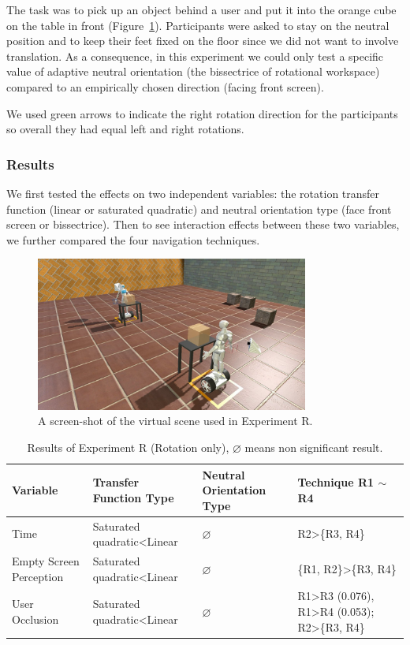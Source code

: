 The task was to pick up an object behind a user and put it into the orange cube on the table in front (Figure~\ref{fig:4_task2}). Participants were asked to stay on the neutral position and to keep their feet fixed on the floor since we did not want to involve translation. As a consequence, in this experiment we could only test a specific value of adaptive neutral orientation (the bissectrice of rotational workspace) compared to an empirically chosen direction (facing front screen).

We used green arrows to indicate the right rotation direction for the participants so overall they had equal left and right rotations.

\subsubsection{Results}
We first tested the effects on two independent variables: the rotation transfer function (linear or saturated quadratic) and neutral orientation type (face front screen or bissectrice). Then to see interaction effects between these two variables, we further compared the four navigation techniques.

\begin{figure}[htb]
  \centering
  \includegraphics[width=0.8\textwidth]{figures/ch4/t2}
  \caption{\label{fig:4_task2}A screen-shot of the virtual scene used in Experiment R.}
\end{figure}

\begin{table}[hbt]
\renewcommand{\arraystretch}{1.3}
\caption{Results of Experiment R (Rotation only), $\varnothing$ means non significant result.}
\label{tab:4_result_t2}
\small
\centering
\begin{tabular}{p{2.5cm} l p{3cm} p{4.5cm}}
  \hline
  Variable & Transfer Function Type & Neutral Orientation Type & Technique R1 $\sim$ R4 \\
  \hline
  Time & Saturated quadratic\textless Linear & $\varnothing$ & R2\textgreater \{R3, R4\} \\
  Empty Screen Perception & Saturated quadratic\textless Linear & $\varnothing$ & \{R1, R2\}\textgreater\{R3, R4\} \\
  User Occlusion & Saturated quadratic\textless Linear & $\varnothing$ & R1\textgreater R3 (0.076), R1\textgreater R4 (0.053); R2\textgreater \{R3, R4\} \\
  \hline
\end{tabular}
\end{table}

